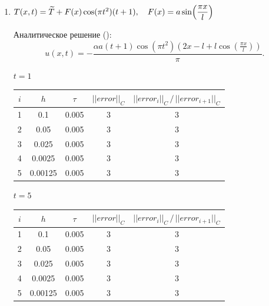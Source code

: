 \documentclass[12pt,a4paper]{article}
\begin{document}
\begin{enumerate}
    \pagebreak

    \item $T(x, t) = \widetilde{T} + F(x) \cos (\pi t^2) (t + 1), \quad F(x) = a \sin \Bigl( \dfrac{\pi x}{l} \Bigr)$
    
    Аналитическое решение ():
    \[
      u(x, t) = -\dfrac{\alpha a (t+1) \cos (\pi t^2) (2x - l + l \cos (\tfrac{\pi x}{l}))}{\pi}.
    \]

    \centerline{$t = 1$}
    \vspace{0.5em}
    \begin{center}
      \begin{tabular}{|c|c|c|c|c|}
        \hline
        $i$ & $h$     & $\tau$ & $|| error ||_C$ & $|| error_i ||_C \, / \, || error_{i+1} ||_C$ \\
        \hline
        1   & 0.1     & 0.005  & 3 & 3 \\
        \hline 
        2   & 0.05    & 0.005  & 3 & 3 \\
        \hline
        3   & 0.025   & 0.005  & 3 & 3 \\
        \hline
        4   & 0.0025  & 0.005  & 3 & 3 \\
        \hline 
        5   & 0.00125 & 0.005  & 3 & 3 \\
        \hline
      \end{tabular}
    \end{center}

    \vspace{1cm}

    \centerline{$t = 5$}
    \vspace{0.5em}
    \begin{center}
      \begin{tabular}{|c|c|c|c|c|}
        \hline
        $i$ & $h$     & $\tau$ & $|| error ||_C$ & $|| error_i ||_C \, / \, || error_{i+1} ||_C$ \\
        \hline
        1   & 0.1     & 0.005  & 3 & 3 \\
        \hline 
        2   & 0.05    & 0.005  & 3 & 3 \\
        \hline
        3   & 0.025   & 0.005  & 3 & 3 \\
        \hline
        4   & 0.0025  & 0.005  & 3 & 3 \\
        \hline 
        5   & 0.00125 & 0.005  & 3 & 3 \\
        \hline
      \end{tabular}
    \end{center}


\end{enumerate}
\end{document}
